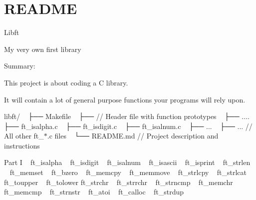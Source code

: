 \chapter{README}
\hypertarget{md_README}{}\label{md_README}
Libft

My very own first library

Summary\+:

This project is about coding a C library.

It will contain a lot of general purpose functions your programs will rely upon.

libft/ ~\newline
 ├── Makefile ~\newline
 ├──  // Header file with function prototypes ~\newline
 ├── .... ~\newline
 ├── ft\+\_\+isalpha.\+c ~\newline
 ├── ft\+\_\+isdigit.\+c ~\newline
 ├── ft\+\_\+isalnum.\+c ~\newline
 ├── ... ~\newline
 ├── ... // All other ft\+\_\+\texorpdfstring{$\ast$}{*}.c files ~\newline
 └── README.\+md // Project description and instructions ~\newline


Part I ~\newline
 ft\+\_\+isalpha ~\newline
 ft\+\_\+isdigit ~\newline
 ft\+\_\+isalnum ~\newline
 ft\+\_\+isascii ~\newline
 ft\+\_\+isprint ~\newline
 ft\+\_\+strlen ~\newline
 ft\+\_\+memset ~\newline
 ft\+\_\+bzero ~\newline
 ft\+\_\+memcpy ~\newline
 ft\+\_\+memmove ~\newline
 ft\+\_\+strlcpy ~\newline
 ft\+\_\+strlcat ~\newline
 ft\+\_\+toupper ~\newline
 ft\+\_\+tolower ft\+\_\+strchr ~\newline
 ft\+\_\+strrchr ~\newline
 ft\+\_\+strncmp ~\newline
 ft\+\_\+memchr ~\newline
 ft\+\_\+memcmp ~\newline
 ft\+\_\+strnstr ~\newline
 ft\+\_\+atoi ~\newline
 ft\+\_\+calloc ~\newline
 ft\+\_\+strdup ~\newline



